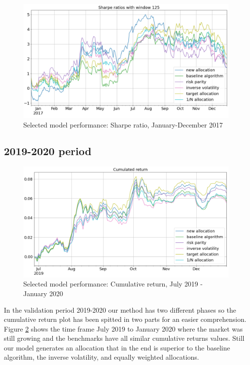 \begin{figure}[H]
	\includegraphics[width=\textwidth]{cap5/selected_sharpe_2017.png}
	\caption{Selected model performance: Sharpe ratio, January-December 2017 }
	\label{fig:sharpe_2017}
\end{figure}


\subsection{2019-2020 period}

\begin{figure}[H]
	\includegraphics[width=\textwidth]{cap5/selected_cum_ret_2019.png}
	\caption{Selected model performance: Cumulative return, July 2019 - January 2020}
	\label{fig:return_2019}
\end{figure}

In the validation period 2019-2020 our method has two different phases so the cumulative return plot has been spitted in two parts for an easier comprehension. Figure \ref{fig:return_2019} shows the time frame July 2019 to January 2020 where the market was still growing and the benchmarks have all similar cumulative returns values. Still our model generates an allocation that in the end is superior to the baseline algorithm, the inverse volatility, and equally weighted allocations. \\

